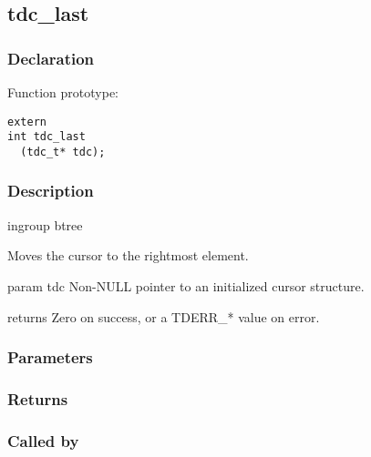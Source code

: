 
\newpage
\subsection{tdc\_last}
\subsubsection{Declaration} Function prototype:

\begin{verbatim}
extern
int tdc_last
  (tdc_t* tdc);
\end{verbatim}

\subsubsection{Description}


 ingroup btree

 Moves the cursor to the rightmost element.

 param tdc Non-NULL pointer to an initialized cursor structure.

 returns Zero on success, or a TDERR\_* value on error.
 

\subsubsection{Parameters}
\subsubsection{Returns}
\subsubsection{Called by}
